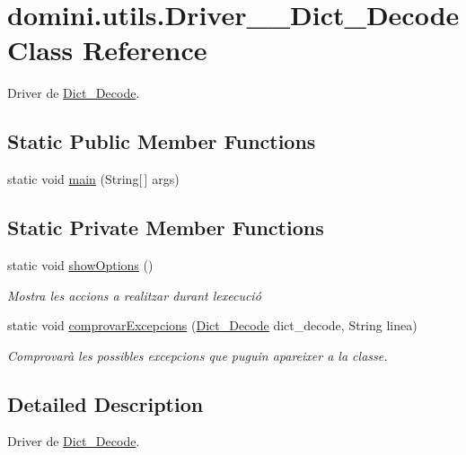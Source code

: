 \hypertarget{classdomini_1_1utils_1_1Driver____Dict__Decode}{}\section{domini.\+utils.\+Driver\+\_\+\+\_\+\+Dict\+\_\+\+Decode Class Reference}
\label{classdomini_1_1utils_1_1Driver____Dict__Decode}


Driver de \hyperlink{classdomini_1_1utils_1_1Dict__Decode}{Dict\+\_\+\+Decode}.  


\subsection*{Static Public Member Functions}
\begin{DoxyCompactItemize}
\item 
static void \hyperlink{classdomini_1_1utils_1_1Driver____Dict__Decode_a5045c12e35617afd929dfeb30930d541}{main} (String\mbox{[}$\,$\mbox{]} args)
\end{DoxyCompactItemize}
\subsection*{Static Private Member Functions}
\begin{DoxyCompactItemize}
\item 
static void \hyperlink{classdomini_1_1utils_1_1Driver____Dict__Decode_af3ae63bfc55ea99e468d6c9c86ec26c9}{show\+Options} ()
\begin{DoxyCompactList}\small\item\em Mostra les accions a realitzar durant l\textquotesingle{}execució \end{DoxyCompactList}\item 
static void \hyperlink{classdomini_1_1utils_1_1Driver____Dict__Decode_a41ddfd0f1473de9401aa7860cff2f3e8}{comprovar\+Excepcions} (\hyperlink{classdomini_1_1utils_1_1Dict__Decode}{Dict\+\_\+\+Decode} dict\+\_\+decode, String linea)
\begin{DoxyCompactList}\small\item\em Comprovarà les possibles excepcions que puguin apareixer a la classe. \end{DoxyCompactList}\end{DoxyCompactItemize}


\subsection{Detailed Description}
Driver de \hyperlink{classdomini_1_1utils_1_1Dict__Decode}{Dict\+\_\+\+Decode}. 

